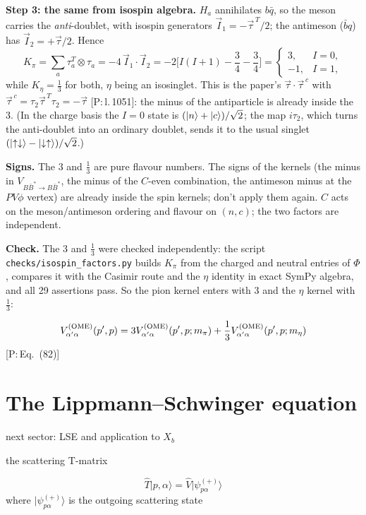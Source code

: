 \documentclass[11pt,a4paper]{article}
\newcommand{\tagP}[1]{\textcolor{blue!65!black}{\textsf{\small[P:\,#1]}}}
\newcommand{\ai}[1]{\textcolor{aicolor}{#1}}
\newcommand{\ai}[1]{#1}
\newenvironment{aiadd}{\par}{\par}
\begin{document}
\begin{aiadd}
	\textbf{Step 3: the same from isospin algebra.} $H_a$ annihilates $b\bar q$, so the meson carries the \emph{anti}-doublet, with isospin generators $\vec I_1=-\vec\tau^{\,T}/2$; the antimeson ($\bar bq$) has $\vec I_2=+\vec\tau/2$. Hence
	\[
		K_\pi=\sum_a\tau_a^T\otimes\tau_a=-4\,\vec I_1\cdot\vec I_2=-2\Big[I(I+1)-\frac34-\frac34\Big]=\begin{cases}3,&I=0,\\-1,&I=1,\end{cases}
	\]
	while $K_\eta=\frac13$ for both, $\eta$ being an isosinglet. This is the paper's $\vec\tau\cdot\vec\tau^{\,c}$ with $\vec\tau^{\,c}=\tau_2\vec\tau^{\,T}\tau_2=-\vec\tau$ \tagP{l.\,1051}: the minus of the antiparticle is already inside the 3. (In the charge basis the $I=0$ state is $(\ket n+\ket c)/\sqrt2$; the map $i\tau_2$, which turns the anti-doublet into an ordinary doublet, sends it to the usual singlet $(\ket{\uparrow\downarrow}-\ket{\downarrow\uparrow})/\sqrt2$.)

	\textbf{Signs.} The 3 and $\frac13$ are pure flavour numbers. The signs of the kernels (the minus in $V_{B\bar B^*\to B\bar B^*}$, the minus of the $C$-even combination, the antimeson minus at the $PV\phi$ vertex) are already inside the spin kernels; don't apply them again. $C$ acts on the meson/antimeson ordering and flavour on $(n,c)$; the two factors are independent.

	\textbf{Check.} The 3 and $\frac13$ were checked independently: the script \texttt{checks/isospin\_factors.py} builds $K_\pi$ from the charged and neutral entries of $\Phi$, compares it with the Casimir route and the $\eta$ identity in exact SymPy algebra, and all 29 assertions pass. So the pion kernel enters with 3 and the $\eta$ kernel with $\frac13$:
\end{aiadd}

\[
	V_{\alpha'\alpha}^{(\rm OME)}(p',p) = 3V_{\alpha'\alpha}^{(\rm OME)}(p',p;m_\pi) + \frac{1}{3}V_{\alpha'\alpha}^{(\rm OME)}(p',p;m_\eta)
\]
\ai{\tagP{Eq.~(82)}}


\section{The Lippmann--Schwinger equation}

next sector: LSE and application to $X_b$

the scattering T-matrix

\[
	\hat T \lvert p,\alpha \rangle = \hat V \lvert \psi_{p\alpha}^{(+)} \rangle
\]
where $\lvert \psi_{p\alpha}^{(+)} \rangle$ is the outgoing scattering state
\end{document}

